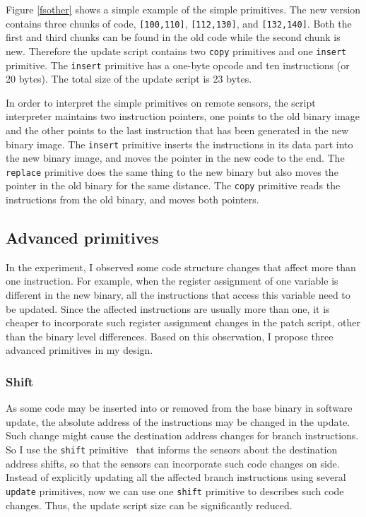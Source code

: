 Figure \ref{fsother} shows a simple example of the simple primitives. The new version contains three chunks of code, {\tt [100,110]}, {\tt [112,130]}, and {\tt [132,140]}. Both the first and third chunks can be found in the old code while the second chunk is new. Therefore the update script contains two {\tt copy} primitives and one {\tt insert} primitive. The {\tt insert} primitive has a one-byte opcode and ten instructions (or 20 bytes). The total size of the update script is 23 bytes.  

In order to interpret the simple primitives on remote sensors,
the script interpreter maintains two instruction pointers, one points to the old
binary image and the other points to the last instruction that has been generated
in the new binary image. 
The {\tt insert} primitive inserts the instructions
in its data part into the new binary image, and moves the pointer in the
new code to the end. The {\tt replace} primitive does the same thing to
the new binary but also moves the pointer in the old binary for the
same distance. The {\tt copy} primitive reads the instructions from the
old binary, and moves both pointers.
 
\subsection {Advanced primitives}
In the experiment, I observed some code structure changes that affect more than one instruction. For example, when the register assignment of one variable is different in the new binary, all the instructions that access this variable need to be updated. Since the affected instructions are usually more than one, it is cheaper to incorporate such register assignment changes in the patch script, other than the binary level differences. Based on this observation, I propose three advanced primitives in my design.

\subsubsection {Shift}
As some code may be inserted into or removed from the base binary in software update, the absolute address of the instructions may be changed in the update. Such change might cause the destination address changes for branch instructions. So I use the {\tt shift} primitive~\cite{related:script} that informs the sensors about the destination address shifts, so that the sensors can incorporate such code changes on side. Instead of explicitly updating all the affected branch instructions using several {\tt update} primitives, now we can use one  {\tt shift} primitive to describes such code changes. Thus, the update script size can be significantly reduced. 

